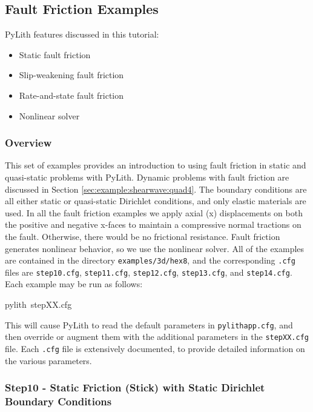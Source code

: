 
\subsection{\label{sec:example:3dhex8-friction}Fault Friction Examples}

PyLith features discussed in this tutorial:
\begin{itemize}
\item Static fault friction
\item Slip-weakening fault friction
\item Rate-and-state fault friction
\item Nonlinear solver
\end{itemize}

\subsubsection{Overview}

This set of examples provides an introduction to using fault friction
in static and quasi-static problems with PyLith. Dynamic problems
with fault friction are discussed in Section \vref{sec:example:shearwave:quad4}.
The boundary conditions are all either static or quasi-static Dirichlet
conditions, and only elastic materials are used. In all the fault
friction examples we apply axial (x) displacements on both the positive
and negative x-faces to maintain a compressive normal tractions on
the fault. Otherwise, there would be no frictional resistance. Fault
friction generates nonlinear behavior, so we use the nonlinear solver.
All of the examples are contained in the directory \texttt{examples/3d/hex8},
and the corresponding \texttt{.cfg} files are \texttt{step10.cfg},
\texttt{step11.cfg}, \texttt{step12.cfg}, \texttt{step13.cfg}, and
\texttt{step14.cfg}. Each example may be run as follows:
\begin{lyxcode}
pylith~stepXX.cfg
\end{lyxcode}
This will cause PyLith to read the default parameters in \texttt{pylithapp.cfg},
and then override or augment them with the additional parameters in
the \texttt{stepXX.cfg} file. Each \texttt{.cfg} file is extensively
documented, to provide detailed information on the various parameters.


\subsubsection{Step10 - Static Friction (Stick) with Static Dirichlet Boundary Conditions}

